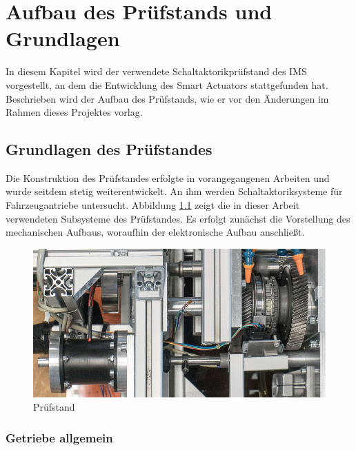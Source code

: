 \chapter{Aufbau des Prüfstands und Grundlagen}\label{kap2}
In diesem Kapitel wird der verwendete Schaltaktorikprüfstand des IMS vorgestellt, an dem  die Entwicklung des Smart Actuators stattgefunden hat. Beschrieben wird der Aufbau des Prüfstands, wie er vor den Änderungen im Rahmen dieses Projektes vorlag.
\section{Grundlagen des Prüfstandes}
Die Konstruktion des Prüfstandes erfolgte in vorangegangenen Arbeiten und wurde seitdem stetig weiterentwickelt. An ihm werden Schaltaktoriksysteme für Fahrzeugantriebe untersucht. Abbildung \ref{fig:Pruefstand} zeigt die in dieser Arbeit verwendeten Subsysteme des Prüfstandes. Es erfolgt zunächst die Vorstellung des mechanischen Aufbaus, woraufhin der elektronische Aufbau anschließt. 
\begin{figure}[h]
	\centering
		\includegraphics{Bilder/Pruefstand.pdf}
	\caption{Prüfstand \cite[S.5]{adp}}
	\label{fig:Pruefstand}
\end{figure}
\subsection{Getriebe allgemein}

